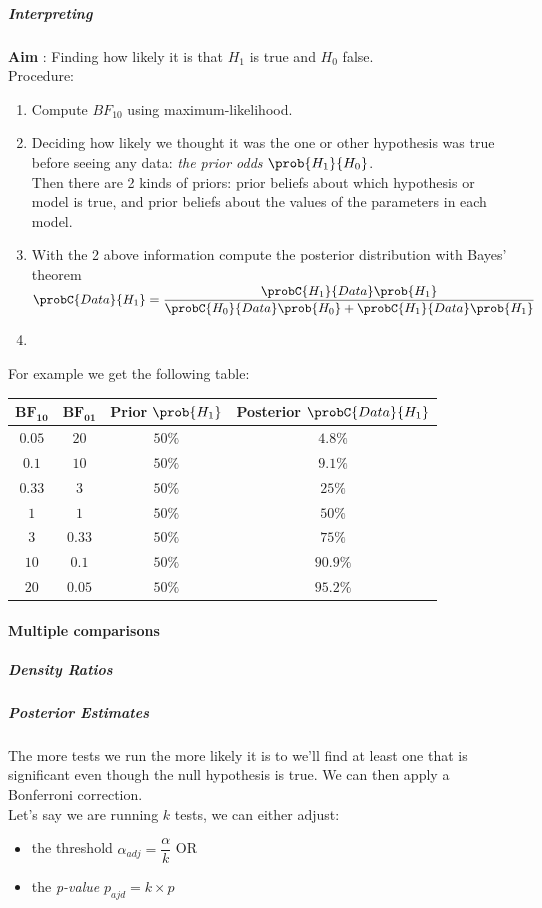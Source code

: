 \subparagraph{Interpreting}
\textbf{Aim} : Finding how likely it is that $H_{1}$ is true and $H_{0}$ false.\\
Procedure: 
\begin{enumerate}
	\item Compute $BF_{10}$ using maximum-likelihood.
	\item Deciding how likely we thought it was the one or other hypothesis was true
		before seeing any data: \emph{the prior odds} $\prob{H_{1}}{H_{0}}$.\\
		Then there are 2 kinds of priors: prior beliefs about which hypothesis or 
		model is true, and prior beliefs about the values of the parameters in 
		each model.
	\item With the 2 above information compute the posterior distribution with Bayes'
		theorem\\ $\probC{Data}{H_{1}}=\dfrac{\probC{H_{1}}{Data}\prob{H_{1}}}{
		\probC{H_{0}}{Data}\prob{H_{0}}+\probC{H_{1}}{Data}\prob{H_{1}}}$
	\item 
\end{enumerate}
For example we get the following table:
\begin{center}
	\begin{tabular}{|*{4}{c|}}
		\hline
		$\mathbf{BF_{10}}$ & $\mathbf{BF_{01}}$ & \textbf{Prior} $\prob{H_{1}}$ &
		\textbf{Posterior} $\probC{Data}{H_{1}}$\\
		\hline
		$0.05$ & $20$ & $50\%$ & $4.8\%$\\
		\hline
		$0.1$ & $10$ & $50\%$ & $9.1\%$\\
		\hline
		$0.33$ & $3$ & $50\%$ & $25\%$\\
		\hline
		$1$ & $1$ & $50\%$ & $50\%$\\
		\hline
		$3$ & $0.33$ & $50\%$ & $75\%$\\
		\hline
		$10$ & $0.1$ & $50\%$ & $90.9\%$\\
		\hline
		$20$ & $0.05$ & $50\%$ & $95.2\%$\\
		\hline
	\end{tabular}
\end{center}


\paragraph{Multiple comparisons}
\subparagraph{Density Ratios}
\subparagraph{Posterior Estimates}
The more tests we run the more likely it is to we'll find at least one that is significant
even though the null hypothesis is true. We can then apply a Bonferroni correction.\\
Let's say we are running $k$ tests, we can either adjust: 
\begin{itemize}
	\item the threshold $\alpha_{adj} = \dfrac{\alpha}{k}$ OR
	\item the \emph{p-value} $p_{ajd} = k\times p$
\end{itemize}

